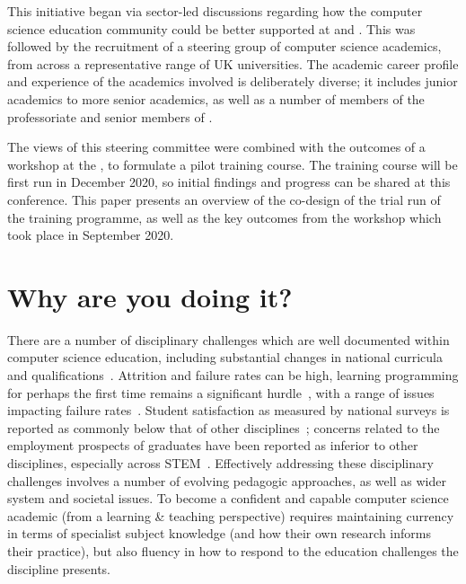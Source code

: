 \documentclass[sigconf]{acmart}
\begin{document}
This initiative began via sector-led discussions regarding how the computer science education community could be better supported at  and . This was followed by the recruitment of a steering group of computer science academics, from across a representative range of UK universities. The academic career profile and experience of the academics involved is deliberately diverse; it includes junior academics to more senior academics, as well as a number of members of the professoriate and senior members of . \begin{comment}
content...
The group also includes a number of computer science academics who have been recognised as National Teaching Fellows by Advance HE. 
\end{comment}
The views of this steering committee were combined with the outcomes of a workshop at the , to formulate a pilot training course. The training course will be first run in December 2020, so initial findings and progress can be shared at this conference. This paper presents an overview of the co-design of the trial run of the training programme, as well as the key outcomes from the workshop which took place in September 2020.


\section{Why are you doing it?}
There are a number of disciplinary challenges which are well
documented within computer science education, including substantial
changes in national curricula and
qualifications~\cite{brown-et-al-toce2014}. Attrition and failure
rates can be high, learning programming for perhaps the first time
remains a significant
hurdle~\cite{davenport-et-al:latice2016,murphy-et-al:programming2017,simon-et-al:sigcse2018},
with a range of issues impacting failure
rates~\cite{Watson:2014:FRI:2591708.2591749,prickett-et-al:iticse2020}. Student
satisfaction as measured by national surveys is reported as commonly
below that of other disciplines~\cite{Sinclair2015}; concerns related
to the employment prospects of graduates have been reported as
inferior to other disciplines, especially across
STEM~\cite{shadbolt2016shadbolt}. Effectively addressing these
disciplinary challenges involves a number of evolving pedagogic
approaches, as well as wider system and societal issues. To become a
confident and capable computer science academic (from a learning \&
teaching perspective) requires maintaining currency in terms of
specialist subject knowledge (and how their own research informs their
practice), but also fluency in how to respond to the
education challenges the discipline presents.
\end{document}
